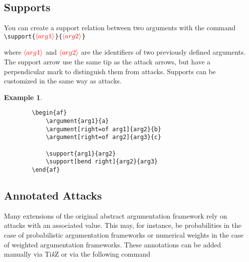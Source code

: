 \documentclass{article}
\newcommand{\tikzname}{Ti\emph{k}Z\xspace}
\newcommand{\opt}[2][red]{\ensuremath{\textcolor{#1}{\langle #2\rangle}}}
\newtheorem{example}{Example}
\begin{document}
\subsection{Supports}
    You can create a support relation between two arguments with the command\\

    \noindent
    \verb|\support{|\opt{arg1}\verb|}{|\opt{arg2}\verb|}|

    \begin{list}{}{\leftmargin=\parindent\rightmargin=0pt}
    \item where \opt{arg1} and \opt{arg2} are the identifiers of two previously defined arguments.
    The support arrow use the same tip as the attack arrows, but have a perpendicular mark to distinguish them from attacks.
    Supports can be customized in the same way as attacks.
    \end{list}
    \begin{example}~
    \begin{verbatim}
        \begin{af}
            \argument{arg1}{a}
            \argument[right=of arg1]{arg2}{b}
            \argument[right=of arg2]{arg3}{c}
    
            \support{arg1}{arg2}
            \support[bend right]{arg2}{arg3}
        \end{af}    
    \end{verbatim}

    \begin{center}
        \begin{af}
    
        \end{af}    
    \end{center}
    \end{example}

\subsection{Annotated Attacks}
    Many extensions of the original abstract argumentation framework rely on attacks with an associated value.
    This may, for instance, be probabilities in the case of probabilistic argumentation frameworks or numerical weights in the case of weighted argumentation frameworks.
    These annotations can be added manually via \tikzname or via the following command\\
\end{document}
